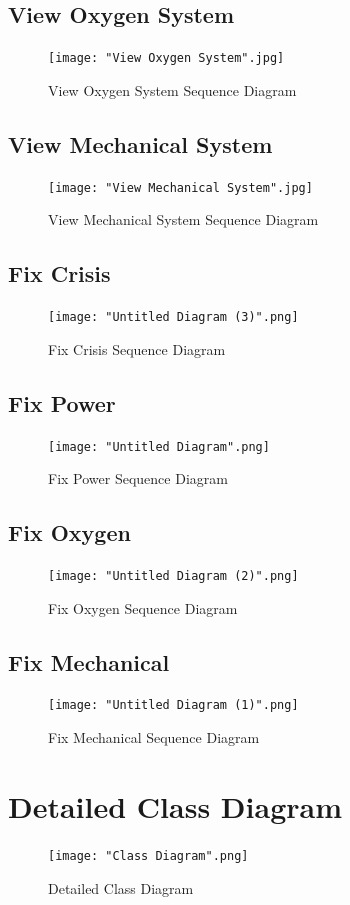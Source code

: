 \documentclass[12pt, titlepage]{article}
\begin{document}
\subsection*{View Oxygen System}
\begin{figure}[H]
\centering
\texttt{[image: "View Oxygen System".jpg]}
\caption{View Oxygen System Sequence Diagram}
\end{figure}
\subsection*{View Mechanical System}
\begin{figure}[H]
\centering
\texttt{[image: "View Mechanical System".jpg]}
\caption{View Mechanical System Sequence Diagram}
\end{figure}
\subsection*{Fix Crisis}
\begin{figure}[H]
\centering
\texttt{[image: "Untitled Diagram (3)".png]}
\caption{Fix Crisis Sequence Diagram}
\end{figure}
\subsection*{Fix Power}
\begin{figure}[H]
\centering
\texttt{[image: "Untitled Diagram".png]}
\caption{Fix Power Sequence Diagram}
\end{figure}
\subsection*{Fix Oxygen}
\begin{figure}[H]
\centering
\texttt{[image: "Untitled Diagram (2)".png]}
\caption{Fix Oxygen Sequence Diagram}
\end{figure}
\subsection*{Fix Mechanical}
\begin{figure}[H]
\centering
\texttt{[image: "Untitled Diagram (1)".png]}
\caption{Fix Mechanical Sequence Diagram}
\end{figure}

\section{Detailed Class Diagram}
\label{sec:detailed_class_diagram}
\begin{figure}[H]
\centering
\texttt{[image: "Class Diagram".png]}
\caption{Detailed Class Diagram}
\end{figure}
\newpage
\appendix
\end{document}
